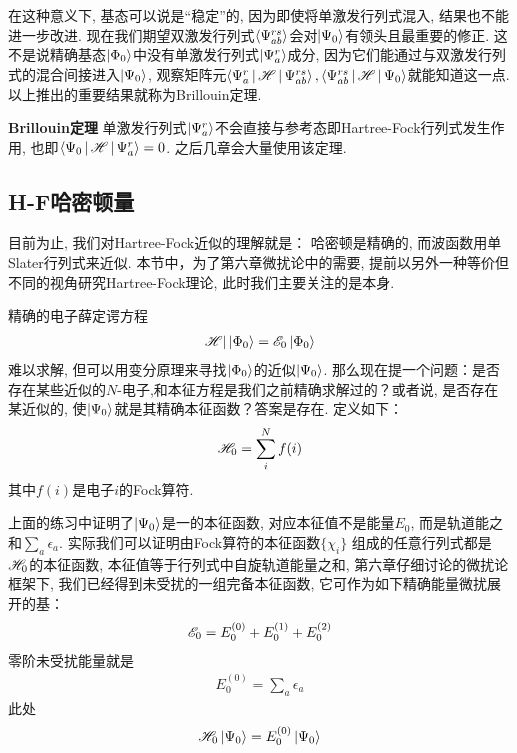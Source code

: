 在这种意义下, \hft 基态可以说是“稳定”的, 因为即使将单激发行列式混入, 结果也不能进一步改进. 现在我们期望双激发行列式$\Braket{\Psi_{ab}^{rs}}$会对$\Ket{\Psi_0}$有领头且最重要的修正. 这不是说精确基态$\Ket{\Phi_0}$中没有单激发行列式$\Ket{\Psi_a^r}$成分, 因为它们能通过与双激发行列式的混合间接进入$\Ket{\Psi_0}$, 观察矩阵元$\Braket{\Psi_a^r|\mathscr{H}|\Psi_{ab}^{rs}},\Braket{\Psi_{ab}^{rs}|\mathscr{H}|\Psi_0}$就能知道这一点. 以上推出的重要结果就称为Brillouin定理. 

\textbf{Brillouin定理} 单激发行列式$\Ket{\Psi_a^r}$不会直接与参考态即Hartree-Fock行列式发生作用, 也即$\Braket{\Psi_0|\mathscr{H}|\Psi_a^r}=0$. 之后几章会大量使用该定理.
\subsection{H-F哈密顿量}
目前为止, 我们对Hartree-Fock近似的理解就是： 哈密顿是精确的, 而波函数用单Slater行列式来近似. 本节中，为了第六章微扰论中的需要, 提前以另外一种等价但不同的视角研究Hartree-Fock理论, 此时我们主要关注的是\ha 本身.

精确的电子薛定谔方程
\begin{align}
\mathscr{H}|\Ket{\Phi_0} = \mathscr{E}_0\Ket{\Phi_0}
\end{align}难以求解, 但可以用变分原理来寻找$\Ket{\Phi_0}$的近似$\Ket{\Psi_0}$. 那么现在提一个问题：是否存在某些近似的$N$-电子\ha,和本征方程是我们之前精确求解过的？或者说, 是否存在某近似的\ha, 使$\Ket{\Psi_0}$就是其精确本征函数？答案是存在. \emph{\hft \ha}定义如下：
\begin{align}
\mathscr{H}_0 = \sum_i^Nf(i)
\end{align}
其中$f(i)是$电子$i$的Fock算符.

上面的练习中证明了$\Ket{\Psi_0}$是一\hft \ha 的本征函数, 对应本征值不是\hft 能量$E_0$, 而是轨道能之和$\sum_a\epsilon_a$. 实际我们可以证明由Fock算符的本征函数$\{\chi_i\}$ 组成的任意行列式都是$\mathscr{H}_0$的本征函数, 本征值等于行列式中自旋轨道能量之和, 第六章仔细讨论的微扰论框架下, 我们已经得到未受扰\ha 的一组完备本征函数, 它可作为如下精确能量微扰展开的基：
\begin{align}
\label{3.104}
\mathscr{E}_0 = E_0^{(0)} + E_0^{(1)} + E_0^{(2)}
\end{align}
零阶未受扰能量就是
\begin{align}
E_0^{(0)} = \sum_a\epsilon_a
\end{align}
此处
\begin{equation}
\mathscr{H}_0\Ket{\Psi_0}=E_0^{(0)}\Ket{\Psi_0}
\end{equation}

